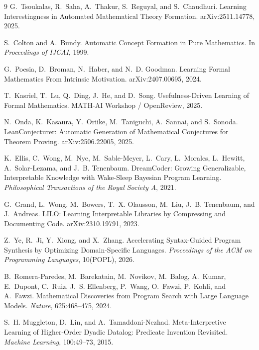 \documentclass[10pt]{article}
\begin{document}
\vspace{4mm}
{\small
\begin{thebibliography}{9}\setlength{\itemsep}{1pt}
G.~Tsoukalas, R.~Saha, A.~Thakur, S.~Reguyal, and S.~Chaudhuri.
\newblock Learning Interestingness in Automated Mathematical Theory Formation.
\newblock arXiv:2511.14778, 2025.

S.~Colton and A.~Bundy.
\newblock Automatic Concept Formation in Pure Mathematics.
\newblock In \emph{Proceedings of IJCAI}, 1999.

G.~Poesia, D.~Broman, N.~Haber, and N.~D. Goodman.
\newblock Learning Formal Mathematics From Intrinsic Motivation.
\newblock arXiv:2407.00695, 2024.

T.~Kasriel, T.~Lu, Q.~Ding, J.~He, and D.~Song.
\newblock Usefulness-Driven Learning of Formal Mathematics.
\newblock MATH-AI Workshop / OpenReview, 2025.

N.~Onda, K.~Kasaura, Y.~Oriike, M.~Taniguchi, A.~Sannai, and S.~Sonoda.
\newblock LeanConjecturer: Automatic Generation of Mathematical Conjectures for Theorem Proving.
\newblock arXiv:2506.22005, 2025.

K.~Ellis, C.~Wong, M.~Nye, M.~Sable-Meyer, L.~Cary, L.~Morales, L.~Hewitt, A.~Solar-Lezama, and J.~B. Tenenbaum.
\newblock DreamCoder: Growing Generalizable, Interpretable Knowledge with Wake-Sleep Bayesian Program Learning.
\newblock \emph{Philosophical Transactions of the Royal Society A}, 2021.

G.~Grand, L.~Wong, M.~Bowers, T.~X. Olausson, M.~Liu, J.~B. Tenenbaum, and J.~Andreas.
\newblock LILO: Learning Interpretable Libraries by Compressing and Documenting Code.
\newblock arXiv:2310.19791, 2023.

Z.~Ye, R.~Ji, Y.~Xiong, and X.~Zhang.
\newblock Accelerating Syntax-Guided Program Synthesis by Optimizing Domain-Specific Languages.
\newblock \emph{Proceedings of the ACM on Programming Languages}, 10(POPL), 2026.

B.~Romera-Paredes, M.~Barekatain, M.~Novikov, M.~Balog, A.~Kumar, E.~Dupont, C.~Ruiz, J.~S. Ellenberg, P.~Wang, O.~Fawzi, P.~Kohli, and A.~Fawzi.
\newblock Mathematical Discoveries from Program Search with Large Language Models.
\newblock \emph{Nature}, 625:468--475, 2024.

S.~H. Muggleton, D.~Lin, and A.~Tamaddoni-Nezhad.
\newblock Meta-Interpretive Learning of Higher-Order Dyadic Datalog: Predicate Invention Revisited.
\newblock \emph{Machine Learning}, 100:49--73, 2015.
\end{thebibliography}
}
\end{document}
